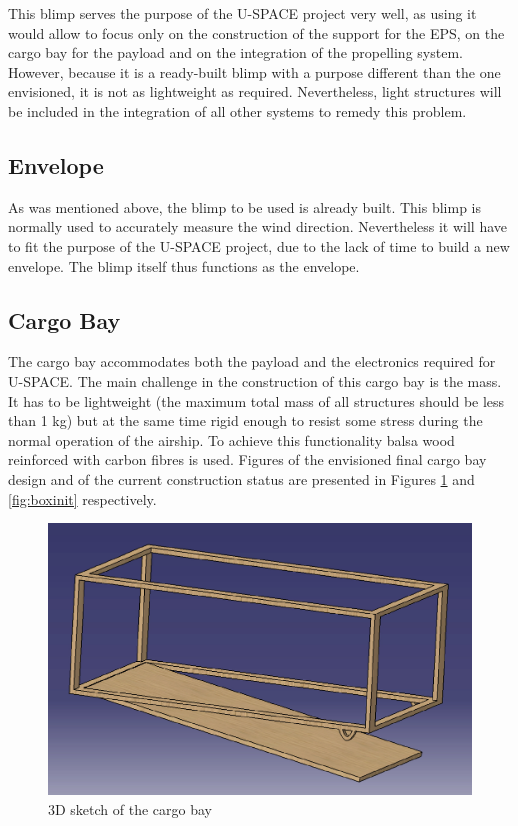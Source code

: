 \noindent
This blimp serves the purpose of the U-SPACE project very well, as using it would allow to focus only on the construction of the support for the \ac{EPS}, on the cargo bay for the payload and on the integration of the propelling system. However, because it is a ready-built blimp with a purpose different than the one envisioned, it is not as lightweight as required. Nevertheless, light structures will be included in the integration of all other systems to remedy this problem.

\subsection{Envelope}

As was mentioned above, the blimp to be used is already built. This blimp is normally used to accurately measure the wind direction. Nevertheless it will have to fit the purpose of the U-SPACE project, due to the lack of time to build a new envelope. The blimp itself thus functions as the envelope.  

\subsection{Cargo Bay}

The cargo bay accommodates both the payload and the electronics required for \ac{U-SPACE}. The main challenge in the construction of this cargo bay is the mass. It has to be lightweight (the maximum total mass of all structures should be less than 1 kg) but at the same time rigid enough to resist some stress during the normal operation of the airship. To achieve this functionality balsa wood reinforced with carbon fibres is used. Figures of the envisioned final cargo bay design and of the current construction status are presented in Figures \ref{fig:box} and \ref{fig:boxinit} respectively. 

\begin{figure}[th!]
\centering
\includegraphics[scale=0.5]{figures/box.png}
\caption{3D sketch of the cargo bay} 
\label{fig:box}
\end{figure}

